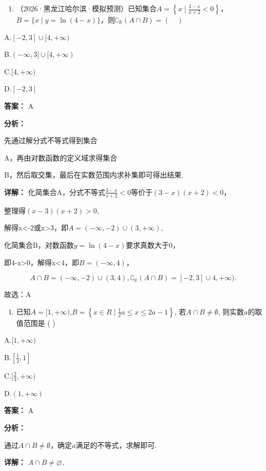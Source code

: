 \documentclass[11pt,a4paper]{ctexart}
\begin{document}
\begin{enumerate}[label=\arabic*., leftmargin=*]
\item （2026·黑龙江哈尔滨·模拟预测）已知集合\(A=\left\{x\mid\frac{3-x}{x+2}<0\right\}\)，\(B=\{x\mid y=\ln(4-x)\}\)，则\(\complement_{\mathbb{R}}(A\cap B)=(\quad)\)
\end{enumerate}

A.\([-2,3]\cup[4,+\infty)\)

B.\((-\infty,3]\cup[4,+\infty)\)

C.\([4,+\infty)\)

D.\([-2,3]\)

\textbf{答案：}
A

\textbf{分析：}

先通过解分式不等式得到集合

A，再由对数函数的定义域求得集合

B，然后取交集，最后在实数范围内求补集即可得出结果.

\textbf{详解：}
化简集合A，分式不等式\(\frac{3-x}{x+2}<0\)等价于\((3-x)(x+2)<0\)，

整理得\((x-3)(x+2)>0\),

解得x\textless-2或x\textgreater3，即\(A=(-\infty,-2)\cup(3,+\infty)\),

化简集合B，对数函数\(y = \ln (4 - x)\)要求真数大于0，

即4-x\textgreater0，解得x\textless4，即\(B=(-\infty,4)\)，

\[
A \cap B = (- \infty , - 2) \cup (3, 4), \complement_{\mathbb{R}} (A \cap B) = [ - 2, 3 ] \cup 4, + \infty).
\]

故选：A

\begin{enumerate}[label=\arabic*., leftmargin=*, start=2]
\item 已知\(A = [1, +\infty)\),\(B = \left\{x \in R \mid \frac{1}{2} a \leq x \leq 2a - 1\right\}\),
  若\(A \cap B \neq \emptyset\), 则实数\(a\)的取值范围是 ( )
\end{enumerate}

A.\([1,+\infty)\)

B.\(\left[\frac{1}{2},1\right]\)

C.\([\frac{2}{3},+\infty)\)

D.\((1,+\infty)\)

\textbf{答案：}
A

\textbf{分析：}

通过\(A \cap B \neq \emptyset\)，确定\(a\)满足的不等式，求解即可.

\textbf{详解：}
\(A \cap B \neq \varnothing,\)
\end{document}
